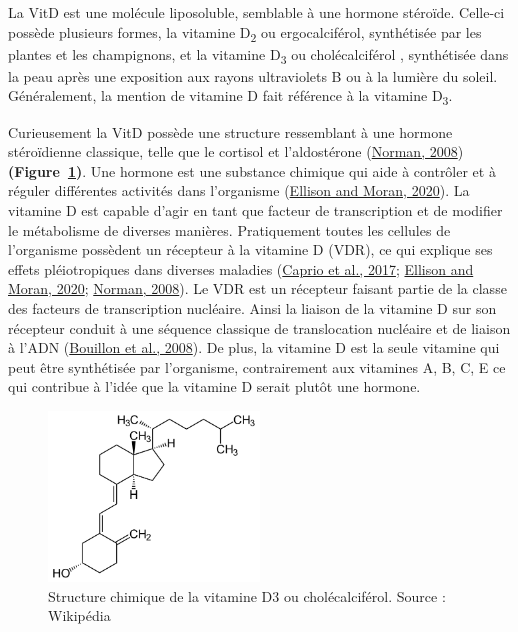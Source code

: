 \documentclass[
  a4paper,
  DIV=11,
  numbers=noendperiod,
  listof=totoc]{scrreprt}
\begin{document}
La VitD est une molécule liposoluble, semblable à une hormone stéroïde.
Celle-ci possède plusieurs formes, la vitamine D\textsubscript{2} ou
ergocalciférol, synthétisée par les plantes et les champignons, et la
vitamine D\textsubscript{3} ou cholécalciférol , synthétisée dans la
peau après une exposition aux rayons ultraviolets B ou à la lumière du
soleil. Généralement, la mention de vitamine D fait référence à la
vitamine D\textsubscript{3}.

Curieusement la VitD possède une structure ressemblant à une hormone
stéroïdienne classique, telle que le cortisol et l'aldostérone
(\protect\hyperlink{ref-Norman.2008}{Norman, 2008})
\textbf{(Figure~\ref{fig-vitd3})}. Une hormone est une substance
chimique qui aide à contrôler et à réguler différentes activités dans
l'organisme (\protect\hyperlink{ref-Ellison.2020}{Ellison and Moran,
2020}). La vitamine D est capable d'agir en tant que facteur de
transcription et de modifier le métabolisme de diverses manières.
Pratiquement toutes les cellules de l'organisme possèdent un récepteur à
la vitamine D (VDR), ce qui explique ses effets pléiotropiques dans
diverses maladies (\protect\hyperlink{ref-Caprio.2017}{Caprio et al.,
2017}; \protect\hyperlink{ref-Ellison.2020}{Ellison and Moran, 2020};
\protect\hyperlink{ref-Norman.2008}{Norman, 2008}). Le VDR est un
récepteur faisant partie de la classe des facteurs de transcription
nucléaire. Ainsi la liaison de la vitamine D sur son récepteur conduit à
une séquence classique de translocation nucléaire et de liaison à l'ADN
(\protect\hyperlink{ref-Bouillon.2008}{Bouillon et al., 2008}). De plus,
la vitamine D est la seule vitamine qui peut être synthétisée par
l'organisme, contrairement aux vitamines A, B, C, E ce qui contribue à
l'idée que la vitamine D serait plutôt une hormone.

\begin{figure}

{\centering \includegraphics[width=0.5\textwidth,height=\textheight]{figures/vitamin-d3.png}

}

\caption{\label{fig-vitd3}Structure chimique de la vitamine D3 ou
cholécalciférol. Source : Wikipédia}

\end{figure}
\end{document}
